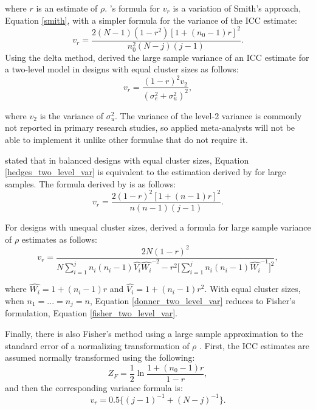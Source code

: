 \noindent where $r$ is an estimate of $\rho$. \cite{swiger1964}'s formula for $v_r$  \cite{swiger1964} is a variation of Smith's approach, Equation \ref{smith}, with a simpler formula for the variance of the ICC estimate:
\begin{equation}\label{swiger}
v_r=   \frac{2(N-1)(1-r^2)[1+(n_0-1)r]^2}{n_0^2(N-j)(j-1)}.
\end{equation} 
Using the delta method,  derived the large sample variance of an ICC estimate for a two-level model in designs with equal cluster sizes as follows:
\begin{equation}\label{hedges_two_level_var}
v_r= \frac{(1-r)^2v_2}{(\sigma_e^2+\sigma^2_u)^2},
\end{equation}

\noindent where $v_2$ is the variance of $\sigma^2_u$. The variance of the level-2 variance is commonly not reported in primary research studies, so applied meta-analysts will not be able to implement it unlike other formulae that do not require it. 

 stated that in balanced designs with equal cluster sizes,  Equation \ref{hedges_two_level_var} is equivalent to the estimation derived by  for large samples.  The formula derived by  is as follows:
\begin{equation}\label{fisher_two_level_var}
 v_r=\frac{2(1-r)^2[1+(n-1)r]^2}{n(n-1)(j-1)}.
\end{equation}

For designs with unequal cluster sizes,  derived a formula for large sample variance of $\rho$ estimates as follows:
\begin{equation}\label{donner_two_level_var}
 v_r=\frac{2N(1-r)^2}{N\sum_{i=1}^{j}n_i(n_i-1)\hat{V_i}\hat{W_i}^{-2}-r^2\Big[\sum_{i=1}^{j}n_i(n_i-1)\hat{W_i}^{-1}\Big]^2},
\end{equation}

\noindent where $\hat{W_i} = 1 + (n_i-1)r$ and $\hat{V_i} = 1 + (n_i-1)r^2$. With equal cluster sizes, when $n_1=...=n_j=n$, Equation \ref{donner_two_level_var} reduces to Fisher's formulation, Equation \ref{fisher_two_level_var}. 

Finally, there is also Fisher's method using a large sample approximation to the standard error of a normalizing transformation of $\rho$ \cite{fisher1970statistical}. First, the ICC estimates are assumed normally transformed using the following:
\begin{equation}\label{fisher_transformed_ICC}
 Z_F=\frac{1}{2} \ln  \frac{1+(n_0-1)r}{1-r},
\end{equation}
and then the corresponding variance formula is:
\begin{equation}\label{fisher_transformed_ICC_var}
 v_r=0.5\{(j-1)^{-1}+(N-j)^{-1}\}.
\end{equation}

